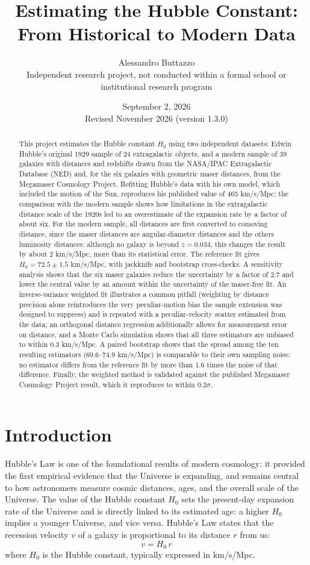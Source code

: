 \documentclass[11pt]{article}
\title{Estimating the Hubble Constant: \\ From Historical to Modern Data}
\author{Alessandro Buttazzo \\ \small Independent research project, not conducted within a formal school or institutional research program}
\date{September 2, 2026 \\ \small Revised November 2026 (version 1.3.0)}
\begin{document}
\maketitle
\tableofcontents
\newpage
\begin{abstract}
This project estimates the Hubble constant $H_0$ using two independent datasets: Edwin Hubble's original 1929 sample of 24 extragalactic objects, and a modern sample of 39 galaxies with distances and redshifts drawn from the NASA/IPAC Extragalactic Database (NED) and, for the six galaxies with geometric maser distances, from the Megamaser Cosmology Project. Refitting Hubble's data with his own model, which included the motion of the Sun, reproduces his published value of 465 km/s/Mpc; the comparison with the modern sample shows how limitations in the extragalactic distance scale of the 1920s led to an overestimate of the expansion rate by a factor of about six. For the modern sample, all distances are first converted to comoving distance, since the maser distances are angular-diameter distances and the others luminosity distances: although no galaxy is beyond $z = 0.034$, this changes the result by about 2 km/s/Mpc, more than its statistical error. The reference fit gives $H_0 = 72.5 \pm 1.5$ km/s/Mpc, with jackknife and bootstrap cross-checks. A sensitivity analysis shows that the six maser galaxies reduce the uncertainty by a factor of 2.7 and lower the central value by an amount within the uncertainty of the maser-free fit. An inverse-variance weighted fit illustrates a common pitfall (weighting by distance precision alone reintroduces the very peculiar-motion bias the sample extension was designed to suppress) and is repeated with a peculiar-velocity scatter estimated from the data; an orthogonal distance regression additionally allows for measurement error on distance, and a Monte Carlo simulation shows that all three estimators are unbiased to within 0.3 km/s/Mpc. A paired bootstrap shows that the spread among the ten resulting estimators (69.6--74.9 km/s/Mpc) is comparable to their own sampling noise: no estimator differs from the reference fit by more than 1.6 times the noise of that difference. Finally, the weighted method is validated against the published Megamaser Cosmology Project result, which it reproduces to within 0.2$\sigma$.
\end{abstract}
\section{Introduction}
Hubble's Law is one of the foundational results of modern cosmology: it provided the first empirical evidence that the Universe is expanding, and remains central to how astronomers measure cosmic distances, ages, and the overall scale of the Universe. The value of the Hubble constant $H_0$ sets the present-day expansion rate of the Universe and is directly linked to its estimated age: a higher $H_0$ implies a younger Universe, and vice versa.
Hubble's Law states that the recession velocity $v$ of a galaxy is proportional to its distance $r$ from us:
\begin{equation}
v = H_0 \, r
\label{eq:hubble_law}
\end{equation}
where $H_0$ is the Hubble constant, typically expressed in km/s/Mpc.
\end{document}
